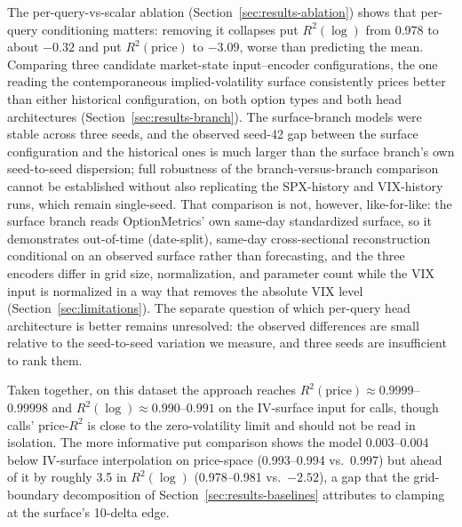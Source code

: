 \documentclass[11pt]{article}
\begin{document}
The per-query-vs-scalar ablation (Section~\ref{sec:results-ablation}) shows that per-query conditioning
matters: removing it collapses put $R^2(\log)$ from 0.978 to about $-0.32$ and put $R^2(\text{price})$ to
$-3.09$, worse than predicting the mean. Comparing three candidate market-state input--encoder
configurations, the one reading the contemporaneous implied-volatility surface consistently prices
better than either historical configuration, on both option types and both head architectures
(Section~\ref{sec:results-branch}). The surface-branch models were stable across three seeds, and the
observed seed-42 gap between the surface configuration and the historical ones is much larger than the
surface branch's own seed-to-seed dispersion; full robustness of the branch-versus-branch comparison
cannot be established without also replicating the SPX-history and VIX-history runs, which remain
single-seed. That comparison is not, however, like-for-like: the surface branch reads OptionMetrics'
own same-day standardized surface, so it demonstrates out-of-time (date-split), same-day cross-sectional
reconstruction conditional on an observed surface rather than forecasting, and the three encoders
differ in grid size, normalization, and parameter count while the VIX input is normalized in a way that
removes the absolute VIX level (Section~\ref{sec:limitations}). The separate question of which
per-query head architecture is better remains unresolved: the observed differences are small relative
to the seed-to-seed variation we measure, and three seeds are insufficient to rank them.

Taken together, on this dataset the approach reaches $R^2(\text{price}) \approx 0.9999$--$0.99998$ and
$R^2(\log) \approx 0.990$--$0.991$ on the IV-surface input for calls, though calls' price-$R^2$ is close
to the zero-volatility limit and should not be read in isolation. The more informative put comparison
shows the model 0.003--0.004 below IV-surface interpolation on price-space (0.993--0.994 vs.\ 0.997)
but ahead of it by roughly 3.5 in $R^2(\log)$ (0.978--0.981 vs.\ $-2.52$), a gap that the
grid-boundary decomposition of Section~\ref{sec:results-baselines} attributes to clamping at the
surface's 10-delta edge.

\end{document}
